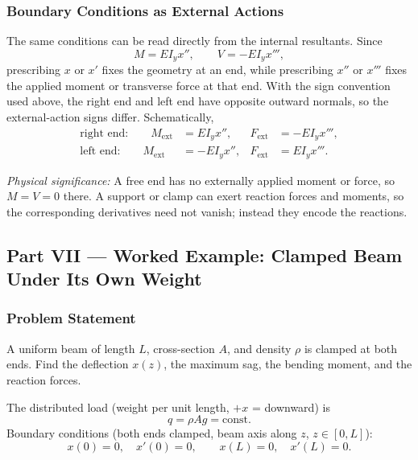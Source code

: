 \documentclass[../main.tex]{subfiles}
\begin{document}
\subsubsection*{Boundary Conditions as External Actions}

The same conditions can be read directly from the internal resultants. Since
\[
  M=EI_y x'',
  \qquad
  V=-EI_y x''',
\]
prescribing $x$ or $x'$ fixes the geometry at an end, while prescribing $x''$ or $x'''$ fixes the applied moment or transverse force at that end. With the sign convention used above, the right end and left end have opposite outward normals, so the external-action signs differ. Schematically,
\begin{align}
  \text{right end:}\qquad
  M_{\mathrm{ext}} &= EI_y x'',
  &
  F_{\mathrm{ext}} &= -EI_y x''',
  \label{eq:lec09_right_boundary_actions}\\
  \text{left end:}\qquad
  M_{\mathrm{ext}} &= -EI_y x'',
  &
  F_{\mathrm{ext}} &= EI_y x'''.
  \label{eq:lec09_left_boundary_actions}
\end{align}

\textit{Physical significance:} A free end has no externally applied moment or force, so $M=V=0$ there. A support or clamp can exert reaction forces and moments, so the corresponding derivatives need not vanish; instead they encode the reactions.

\subsection*{Part VII — Worked Example: Clamped Beam Under Its Own Weight}

\subsubsection*{Problem Statement}
A uniform beam of length $L$, cross-section $A$, and density $\rho$ is clamped at both ends. Find the deflection $x(z)$, the maximum sag, the bending moment, and the reaction forces.

The distributed load (weight per unit length, $+x$ = downward) is
\begin{equation}
  q = \rho A g = \mathrm{const.}
  \label{eq:lec09_q}
\end{equation}
Boundary conditions (both ends clamped, beam axis along $z$, $z\in[0,L]$):
\begin{equation}
  x(0)=0,\quad x'(0)=0,\qquad x(L)=0,\quad x'(L)=0.
  \label{eq:lec09_bc}
\end{equation}
\end{document}
